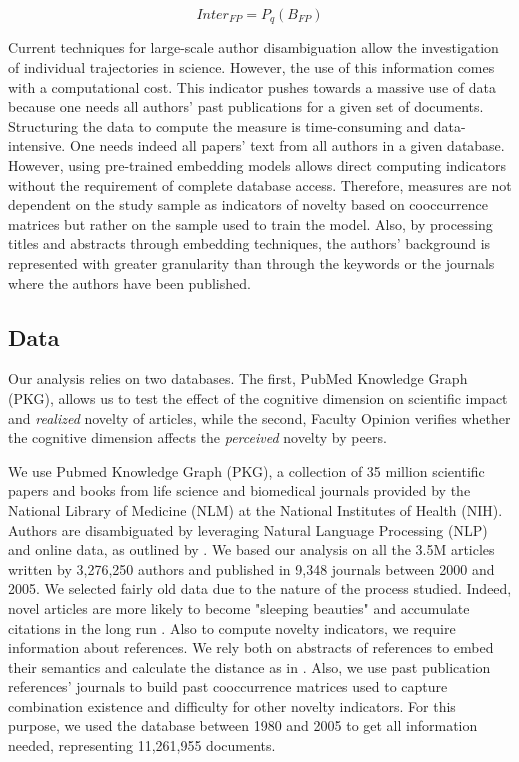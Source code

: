         $$Inter_{FP} = P_{q}(B_{FP})$$
        
        
        Current techniques for large-scale author disambiguation allow the investigation of individual trajectories in science. However, the use of this information comes with a computational cost.
        This indicator pushes towards a massive use of data because one needs all authors' past publications for a given set of documents. Structuring the data to compute the measure is time-consuming and data-intensive. One needs indeed all papers' text from all authors in a given database.
        However, using pre-trained embedding models allows direct computing indicators without the requirement of complete database access. Therefore, measures are not dependent on the study sample as indicators of novelty based on cooccurrence matrices but rather on the sample used to train the model. Also, by processing titles and abstracts through embedding techniques, the authors' background is represented with greater granularity than through the keywords or the journals where the authors have been published.

\subsection{Data}

        Our analysis relies on two databases. The first, PubMed Knowledge Graph (PKG), allows us to test the effect of the cognitive dimension on scientific impact and \textit{realized} novelty of articles, while the second, Faculty Opinion verifies whether the cognitive dimension affects the \textit{perceived} novelty by peers. 
            
       We use Pubmed Knowledge Graph (PKG), a collection of 35 million scientific papers and books from life science and biomedical journals provided by the National Library of Medicine (NLM) at the National Institutes of Health (NIH). Authors are disambiguated by leveraging Natural Language Processing (NLP) and online data, as outlined by \cite{xu2020building}. We based our analysis on all the 3.5M articles written by 3,276,250 authors and published in 9,348 journals between 2000 and 2005. We selected fairly old data due to the nature of the process studied. Indeed, novel articles are more likely to become "sleeping beauties" and accumulate citations in the long run \citep{lin2021novelty}. Also to compute novelty indicators, we require information about references. We rely both on abstracts of references to embed their semantics and calculate the distance as in \cite{shibayama2021measuring}. Also, we use past publication references' journals to build past cooccurrence matrices used to capture combination existence and difficulty for other novelty indicators. For this purpose, we used the database between 1980 and 2005 to get all information needed, representing 11,261,955 documents.
        
